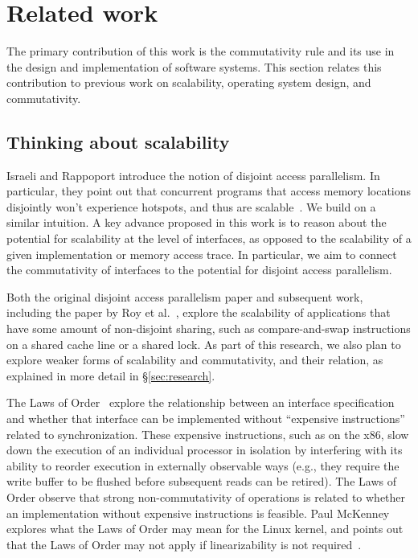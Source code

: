 
\section{Related work}
\label{sec:related}

The primary contribution of this work is the commutativity rule and its
use in the design and implementation of software systems.  This section
relates this contribution to previous work on scalability, operating
system design, and commutativity.

\subsection{Thinking about scalability}

Israeli and Rappoport introduce the notion of disjoint access parallelism.
In particular, they point out that concurrent programs that access
memory locations disjointly won't experience hotspots, and thus 
are scalable~\cite{israeli:disjoint-access}.  We build on a similar intuition.
A key advance proposed in this work is to reason about the potential
for scalability at the level of interfaces, as opposed to the
scalability of a given implementation or memory access trace.
In particular, we aim to connect the commutativity of interfaces to the
potential for disjoint access parallelism.

Both the original disjoint access parallelism paper and subsequent work,
including the paper by Roy et al.~\cite{roy:limits-dap}, explore
the scalability of applications that have some amount of non-disjoint
sharing, such as compare-and-swap instructions on a shared cache line
or a shared lock.  As part of this research, we also plan to explore
weaker forms of scalability and commutativity, and their relation,
as explained in more detail in \S\ref{sec:research}.

The Laws of Order~\cite{law:orders} explore the relationship between an
interface specification and whether that interface can be implemented
without ``expensive instructions'' related to synchronization.  These expensive
instructions, such
as  on the x86, slow down the execution of an individual
processor in isolation by interfering with its ability to reorder execution in
externally observable ways (e.g., they require the write buffer to be
flushed before subsequent reads can be retired).  The Laws of Order observe
that strong non-commutativity of operations is related to whether an
implementation without expensive instructions is feasible.  Paul
McKenney explores what the Laws of Order may mean for the Linux kernel,
and points out that the Laws of Order may not apply if linearizability
is not required~\cite{lwn:law}.


